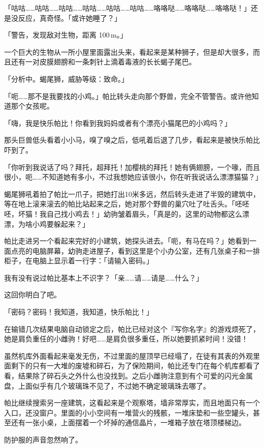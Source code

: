 「咕咕……咕咕……咕咕……咕咕……咕咕……咕咕……咯咯哒……咯咯哒……咯咯哒！」还是没反应，真奇怪。「或许她睡了？」


「{\mtzh 警告，发现敌对生物，距离 100\,m。}」

一个巨大的生物从一所小屋里面露出头来，看起来是某种狮子，但是却大很多，而且还有一对皮膜翅膀和一条刺针上滴着毒液的长长蝎子尾巴。

「{\mtzh 分析中。蝎尾狮，威胁等级：致命。}」

「呃……那不是我要找的小鸡。」帕比转头走向那个野兽，完全不管警告。或许他知道那个女孩呢。

「嗨，我是快乐帕比！你看到我妈妈或者有个漂亮小猫尾巴的小鸡吗？」

那头巨兽低头看着小小马，嗅了嗅之后，低吼着后退了几步，看起来是被快乐帕比吓到了。

「你听到我说话了吗？拜托，超拜托！加樱桃的拜托！她有俩翅膀，一个喙，而且很小，呃……不知道她有多小，不过我想她应该很小，你在听我说话么漂漂猫猫？」

蝎尾狮吼着拍了帕比一爪子，把她打出10米多远，然后转头走进了半毁的建筑中，等在地上滚来滚去的帕比站起来之后，她对那个野兽的巢穴吐了吐舌头。「呸呸呸，坏猫！我自己找小鸡去！」幼驹皱着眉头，「真是的，这里的动物都这么漂漂，为啥小鸡要躲起来？」

帕比走进另一个看起来完好的小建筑，她探头进去。「呃，有马在吗？」她看到一面点亮的电脑屏幕，幼驹走进屋子，看到这里是个小办公室，还有几张桌子和一排柜子，在电脑上显示着一行字：「{\mtzh 请输入密码。}」

我有没有说过帕比基本上不识字？「亲……请……请是……什么？」

这回你明白了吧。

「密码？密码！我知道，我知道，快乐帕比！」

在输错几次结果电脑自动锁定之后，帕比已经对这个『写你名字』的游戏烦死了，她是肩负重任的小雌驹！好吧……是肩负很多重任，所以她要抓紧时间！没错！

虽然机库外面看起来毫发无伤，不过里面的屋顶早已经塌了，在徒有其表的外观里面剩下的只有一大堆的废墟和碎石，为了保险期间，帕比还专门在每个机库都看了看，结果除了碎石头之外什么也没找到。之后小雌驹注意到有个可爱的闪光金属盘，上面似乎有几个玻璃珠不见了，不过她不确定玻璃珠去哪了。

帕比继续搜索另一座建筑，这看起来是个观察塔，墙非常厚实，而且地面只有一个入口，还没窗户。里面的小小空间有一堆营火的残骸，一堆床垫和一些空罐头，甚至还有一张小桌，上面摆着一个坏掉的通信晶片，一堆箱子放在塔顶楼梯边。

防护服的声音忽然响了。


